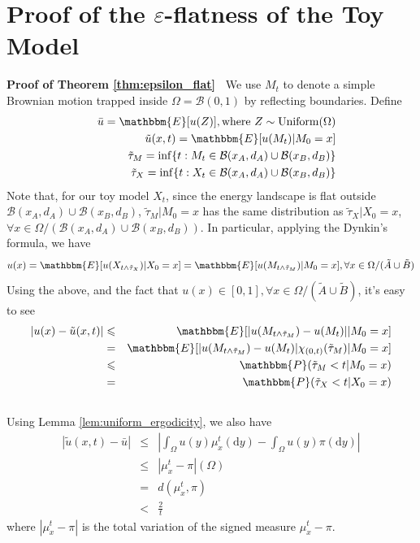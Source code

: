 \documentclass[english, aip, jcp, priprint, graphicx,floatfix]{revtex4-1}
\newcommand{\mathd}{\mathrm{d}}
\newcommand{\tmop}[1]{\ensuremath{\operatorname{#1}}}
\theoremstyle{plain}
\theoremstyle{definition}
\theoremstyle{plain}
\begin{document}
\section{Proof of the $\varepsilon$-flatness of the Toy Model}\label{sec:proof_epsilon_flat}

\noindent\textbf{Proof of Theorem \ref{thm:epsilon_flat}\ }
We use $M_t$ to denote a simple Brownian motion
trapped inside $\Omega = \mathcal{B} (0, 1)$ by reflecting boundaries. Define
\begin{eqnarray*}
&  & \bar{u} =\mathbbm{E} [u (Z)], \text{where } Z \sim \tmop{Uniform}
(\Omega)\\
&  & \tilde{u} (x, t) =\mathbbm{E} [u (M_t) |M_0 = x]\\
&  & \tilde{\tau}_M = \inf \{ t : M_t \in \mathcal{B} (x_A, d_A) \cup
\mathcal{B} (x_B, d_B) \}\\
&  & \tilde{\tau}_X = \inf \{ t : X_t \in \mathcal{B} (x_A, d_A) \cup
\mathcal{B} (x_B, d_B) \}
\end{eqnarray*}
Note that, for our toy model $X_t$, since the energy landscape is flat outside
$\mathcal{B} (x_A, d_A) \cup \mathcal{B} (x_B, d_B)$, $\tilde{\tau}_M |M_0 =
x$ has the same distribution as $\tilde{\tau}_X |X_0 = x$, $\forall x \in
\Omega / (\mathcal{B} (x_A, d_A) \cup \mathcal{B} (x_B, d_B))$. In particular,
applying the Dynkin's formula, we have
\[ u (x) =\mathbbm{E} [u (X_{t \wedge \tilde{\tau}_X}) |X_0 = x] =\mathbbm{E}
[u (M_{t \wedge \tilde{\tau}_M}) |M_0 = x], \forall x \in \Omega /
(\tilde{A} \cup \tilde{B}) \]
Using the above, and the fact that $u (x) \in [0, 1], \forall x \in \Omega /
(\tilde{A} \cup \tilde{B})$, it's easy to see
\begin{eqnarray*}
| u (x) - \tilde{u} (x, t) | & \leqslant & \mathbbm{E} [| u (M_{t \wedge
\tilde{\tau}_M}) - u (M_t) | |M_0 = x]\\
& = & \mathbbm{E} [| u (M_{t \wedge \tilde{\tau}_M}) - u (M_t) | \chi_{(0,
t)} (\tilde{\tau}_M) |M_0 = x]\\
& \leqslant & \mathbbm{P} (\tilde{\tau}_M < t|M_0 = x)\\
& = & \mathbbm{P} (\tilde{\tau}_X < t|X_0 = x)\\
&  & 
\end{eqnarray*}
Using Lemma \ref{lem:uniform_ergodicity}, we also have
\begin{eqnarray*}
| \tilde{u} (x, t) - \bar{u} | & \leqslant & \left| \int_{\Omega} u (y)
\mu_x^t (\mathd y) - \int_{\Omega} u (y) \pi (\mathd y) \right|\\
& \leqslant & | \mu_x^t - \pi | (\Omega)\\
& = & d (\mu_x^t, \pi)\\
& < & \frac{2}{t}
\end{eqnarray*}
where $| \mu_x^t - \pi |$ is the total variation of the signed measure
$\mu_x^t - \pi$.
\end{document}
